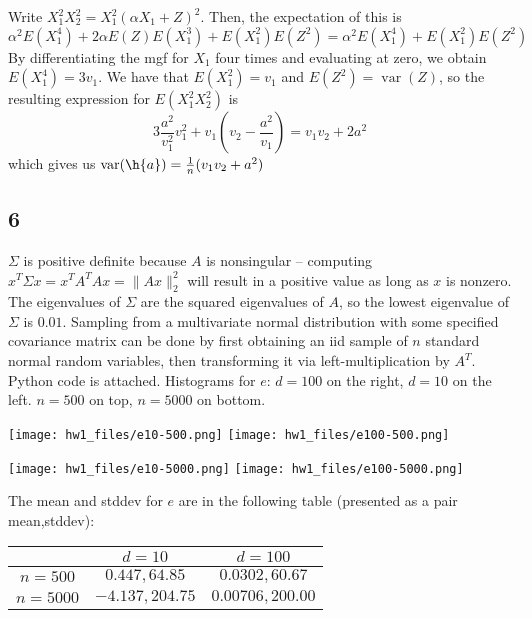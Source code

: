 \documentclass{article}
\newcommand{\openm}{\begin{pmatrix}}
\newcommand{\closem}{\end{pmatrix}}
\DeclareMathOperator{\var}{var}
\begin{document}
%
Write $X_1^2X_2^2=X_1^2(\alpha X_1+Z)^2$. Then, the expectation of this is
\[\alpha^2E(X_1^4)+2\alpha E(Z)E(X_1^3)+E(X_1^2)E(Z^2)=\alpha^2E(X_1^4)+E(X_1^2)E(Z^2)\]
By differentiating the mgf for $X_1$ four times and evaluating at zero, we obtain $E(X_1^4)=3v_1$. We have that $E(X_1^2)=v_1$ and $E(Z^2)=\var(Z)$, so the resulting expression for $E(X_1^2X_2^2)$ is
\[3\frac{a^2}{v_1^2}v_1^2+v_1\left(v_2-\frac{a^2}{v_1}\right)=v_1v_2+2a^2\]
which gives us $\var(\h{a})=\frac{1}{n}(v_1v_2+a^2)$
\subsection*{6}
$\Sigma$ is positive definite because $A$ is nonsingular -- computing $x^T\Sigma x=x^TA^TAx=\|Ax\|_2^2$ will result in a positive value as long as $x$ is nonzero. The eigenvalues of $\Sigma$ are the squared eigenvalues of $A$, so the lowest eigenvalue of $\Sigma$ is $0.01$.
Sampling from a multivariate normal distribution with some specified covariance matrix can be done by first obtaining an iid sample of $n$ standard normal random variables, then transforming it via left-multiplication by $A^T$. Python code is attached.
Histograms for $e$: $d=100$ on the right, $d=10$ on the left. $n=500$ on top, $n=5000$ on bottom.

\texttt{[image: hw1\_files/e10-500.png]}
\texttt{[image: hw1\_files/e100-500.png]}

\texttt{[image: hw1\_files/e10-5000.png]}
\texttt{[image: hw1\_files/e100-5000.png]}

The mean and stddev for $e$ are in the following table (presented as a pair mean,stddev):

\begin{tabular}{c|c|c}
    &$d=10$&$d=100$\\
    \hline
    $n=500$&$0.447,64.85$&$0.0302,60.67$\\
    \hline
    $n=5000$&$-4.137,204.75$&$0.00706,200.00$\\
\end{tabular}
\end{document}
